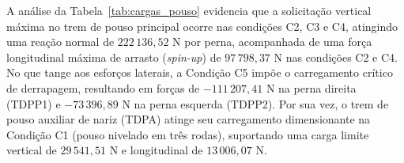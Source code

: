 A análise da Tabela~\ref{tab:cargas_pouso} evidencia que a solicitação vertical máxima no trem de pouso principal ocorre nas condições C2, C3 e C4, atingindo uma reação normal de $222\,136,52\text{ N}$ por perna, acompanhada de uma força longitudinal máxima de arrasto (\textit{spin-up}) de $97\,798,37\text{ N}$ nas condições C2 e C4. No que tange aos esforços laterais, a Condição C5 impõe o carregamento crítico de derrapagem, resultando em forças de $-111\,207,41\text{ N}$ na perna direita (TDPP1) e $-73\,396,89\text{ N}$ na perna esquerda (TDPP2). Por sua vez, o trem de pouso auxiliar de nariz (TDPA) atinge seu carregamento dimensionante na Condição C1 (pouso nivelado em três rodas), suportando uma carga limite vertical de $29\,541,51\text{ N}$ e longitudinal de $13\,006,07\text{ N}$.
